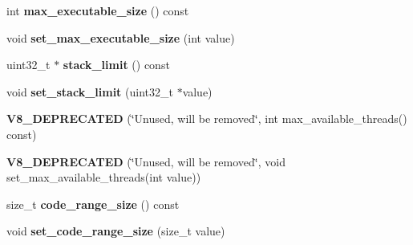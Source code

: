 \begin{DoxyCompactItemize}
\item 
\hypertarget{classv8_1_1_resource_constraints_a037777e608ed1c22fe294ecef5722036}{}int {\bfseries max\+\_\+executable\+\_\+size} () const \label{classv8_1_1_resource_constraints_a037777e608ed1c22fe294ecef5722036}

\item 
\hypertarget{classv8_1_1_resource_constraints_a37d1b38672e9844c567823a119dcd557}{}void {\bfseries set\+\_\+max\+\_\+executable\+\_\+size} (int value)\label{classv8_1_1_resource_constraints_a37d1b38672e9844c567823a119dcd557}

\item 
\hypertarget{classv8_1_1_resource_constraints_aafc4a94f2eeb0684e7a50f355eb4d06d}{}uint32\+\_\+t $\ast$ {\bfseries stack\+\_\+limit} () const \label{classv8_1_1_resource_constraints_aafc4a94f2eeb0684e7a50f355eb4d06d}

\item 
\hypertarget{classv8_1_1_resource_constraints_a26ed3e89985a4afe34e84509fb093cf1}{}void {\bfseries set\+\_\+stack\+\_\+limit} (uint32\+\_\+t $\ast$value)\label{classv8_1_1_resource_constraints_a26ed3e89985a4afe34e84509fb093cf1}

\item 
\hypertarget{classv8_1_1_resource_constraints_ac9f4b9010ed635944cffee59f4f22795}{}{\bfseries V8\+\_\+\+D\+E\+P\+R\+E\+C\+A\+T\+E\+D} (\char`\"{}Unused, will be removed\char`\"{}, int max\+\_\+available\+\_\+threads() const)\label{classv8_1_1_resource_constraints_ac9f4b9010ed635944cffee59f4f22795}

\item 
\hypertarget{classv8_1_1_resource_constraints_a5a5c9962c1376dd99511fea06659abdb}{}{\bfseries V8\+\_\+\+D\+E\+P\+R\+E\+C\+A\+T\+E\+D} (\char`\"{}Unused, will be removed\char`\"{}, void set\+\_\+max\+\_\+available\+\_\+threads(int value))\label{classv8_1_1_resource_constraints_a5a5c9962c1376dd99511fea06659abdb}

\item 
\hypertarget{classv8_1_1_resource_constraints_a8dd511917ad17bf2185d574b0c7e4186}{}size\+\_\+t {\bfseries code\+\_\+range\+\_\+size} () const \label{classv8_1_1_resource_constraints_a8dd511917ad17bf2185d574b0c7e4186}

\item 
\hypertarget{classv8_1_1_resource_constraints_af887bf453b41b79eb174e5eeee0f1db2}{}void {\bfseries set\+\_\+code\+\_\+range\+\_\+size} (size\+\_\+t value)\label{classv8_1_1_resource_constraints_af887bf453b41b79eb174e5eeee0f1db2}

\end{DoxyCompactItemize}


